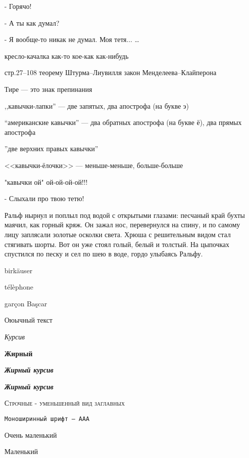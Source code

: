 \documentclass[12pt]{article}
\begin{document}
    - Горячо!

    - А ты как думал?

    - Я вообще-то никак не думал. Моя тетя... \ldots

кресло-качалка    как-то  кое-как как-нибудь


стр.27--108  теорему Штурма--Лиувилля  закон Менделеева--Клайперона


Тире --- это знак препинания

,,кавычки-лапки'' --- две запятых, два апострофа (на букве э)

``американские кавычки'' --- два обратных апострофа (на букве ё), два прямых апострофа

''две верхних правых кавычки''

<<кавычки-ёлочки>> --- меньше-меньше, больше-больше

"кавычки ой" ой-ой-ой-ой!!!

    - Слыхали про твою тетю!

    Ральф нырнул и поплыл под водой  с  открытыми  глазами:  песчаный  край
бухты  маячил,  как  горный  кряж. Он зажал нос, перевернулся на спину, и по
самому лицу заплясали золотые осколки света. Хрюша с решительным видом  стал
стягивать  шорты.  Вот  он  уже  стоял  голый,  белый и толстый. На цыпочках
спустился по песку и сел по шею в воде, гордо улыбаясь Ральфу.  





birk\"{a}user

t\'{e}l\`{e}phone

gar\c{c}on Ba\c{s}car

\textrm{Оюычный текст}

\textit{Курсив}

\textbf{Жирный}

\textit{\textbf{Жирный курсив}}

\textbf{\textit{Жирный курсив}}

\textsc{Строчные - уменьшенный вид заглавных}

\texttt{Моноширинный шрифт --- ААА}



{\tiny Очень маленький}

{\footnotesize Маленький}
\end{document}
